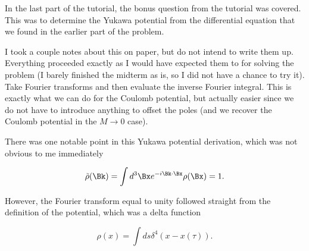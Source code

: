 %
%


In the last part of the tutorial, the bonus question from the tutorial was covered.  This was to determine the Yukawa potential from the differential equation that we found in the earlier part of the problem.

I took a couple notes about this on paper, but do not intend to write them up.  Everything proceeded exactly as I would have expected them to for solving the problem (I barely finished the midterm as is, so I did not have a chance to try it).  Take Fourier transforms and then evaluate the inverse Fourier integral.  This is exactly what we can do for the Coulomb potential, but actually easier since we do not have to introduce anything to offset the poles (and we recover the Coulomb potential in the $M \rightarrow 0$ case).

There was one notable point in this Yukawa potential derivation, which was not obvious to me immediately

\begin{equation}\label{eqn:relativisticElectrodynamicsT8:350}
\tilde{\rho}(\Bk) = \int d^3 \Bx e^{-i \Bk \cdot \Bx} \rho(\Bx) = 1.
\end{equation}

However, the Fourier transform equal to unity followed straight from the definition of the potential, which was a delta function

\begin{equation}\label{eqn:relativisticElectrodynamicsT8:340}
\rho(x) = \int ds \delta^4(x - x(\tau)).
\end{equation}

